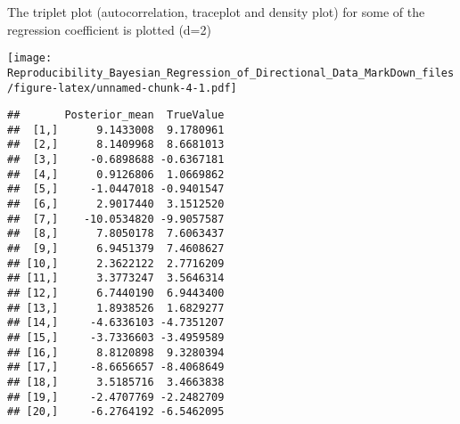 \documentclass[
]{article}
\newenvironment{Shaded}{\begin{snugshade}}{\end{snugshade}}
\newcommand{\AttributeTok}[1]{\textcolor[rgb]{0.13,0.29,0.53}{#1}}
\newcommand{\CommentTok}[1]{\textcolor[rgb]{0.56,0.35,0.01}{\textit{#1}}}
\newcommand{\DecValTok}[1]{\textcolor[rgb]{0.00,0.00,0.81}{#1}}
\newcommand{\FunctionTok}[1]{\textcolor[rgb]{0.13,0.29,0.53}{\textbf{#1}}}
\newcommand{\NormalTok}[1]{#1}
\newcommand{\OtherTok}[1]{\textcolor[rgb]{0.56,0.35,0.01}{#1}}
\newcommand{\SpecialCharTok}[1]{\textcolor[rgb]{0.81,0.36,0.00}{\textbf{#1}}}
\begin{document}
The triplet plot (autocorrelation, traceplot and density plot) for some
of the regression coefficient is plotted (d=2)

\begin{Shaded}
\end{Shaded}

\texttt{[image: Reproducibility\_Bayesian\_Regression\_of\_Directional\_Data\_MarkDown\_files/figure-latex/unnamed-chunk-4-1.pdf]}

\begin{Shaded}
\end{Shaded}

\begin{verbatim}
##       Posterior_mean  TrueValue
##  [1,]      9.1433008  9.1780961
##  [2,]      8.1409968  8.6681013
##  [3,]     -0.6898688 -0.6367181
##  [4,]      0.9126806  1.0669862
##  [5,]     -1.0447018 -0.9401547
##  [6,]      2.9017440  3.1512520
##  [7,]    -10.0534820 -9.9057587
##  [8,]      7.8050178  7.6063437
##  [9,]      6.9451379  7.4608627
## [10,]      2.3622122  2.7716209
## [11,]      3.3773247  3.5646314
## [12,]      6.7440190  6.9443400
## [13,]      1.8938526  1.6829277
## [14,]     -4.6336103 -4.7351207
## [15,]     -3.7336603 -3.4959589
## [16,]      8.8120898  9.3280394
## [17,]     -8.6656657 -8.4068649
## [18,]      3.5185716  3.4663838
## [19,]     -2.4707769 -2.2482709
## [20,]     -6.2764192 -6.5462095
\end{verbatim}
\end{document}
